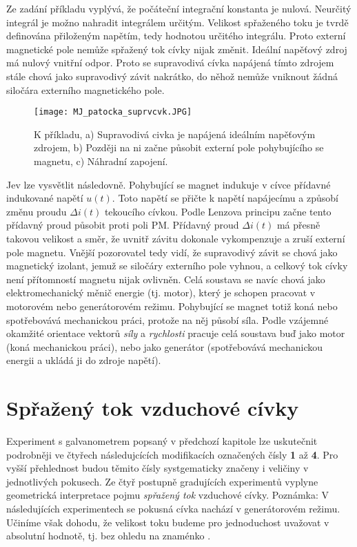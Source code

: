     Ze zadání příkladu vyplývá, že počáteční integrační konstanta je nulová. Neurčitý integrál je
    možno nahradit integrálem určitým. Velikost spřaženého toku je tvrdě definována přiloženým
    napětím, tedy hodnotou určitého integrálu. Proto externí magnetické pole nemůže spřažený tok
    cívky nijak změnit. Ideální napěťový zdroj má nulový vnitřní odpor. Proto se supravodivá cívka
    napájená tímto zdrojem stále chová jako supravodivý závit nakrátko, do něhož nemůže vniknout
    žádná siločára externího magnetického pole.
    
    \begin{figure}[ht!]
      \centering
      \texttt{[image: MJ\_patocka\_suprvcvk.JPG]}
      \caption[Supravodivá cívka]{K příkladu, a) Supravodivá civka je napájená ideálním napěťovým
               zdrojem, b) Později na ni začne působit externí pole pohybujícího se magnetu, c)
               Náhradní zapojení.}
      \label{es:fig_MJ_patocka_suprvcvk}
    \end{figure} 
    
    Jev lze vysvětlit následovně. Pohybující se magnet indukuje v cívce přídavné indukované napětí 
    \(u(t)\). Toto napětí se přičte k napětí napájecímu a způsobí změnu proudu \(\Delta i(t)\)
    tekoucího cívkou. Podle Lenzova principu začne tento přídavný proud působit proti poli PM.
    Přídavný proud \(\Delta i(t)\) má přesně takovou velikost a směr, že uvnitř závitu dokonale
    vykompenzuje a zruší externí pole magnetu. Vnější pozorovatel tedy vidí, že supravodivý závit
    se chová jako magnetický izolant, jemuž se siločáry externího pole vyhnou, a celkový tok cívky
    není přítomností magnetu nijak ovlivněn. Celá soustava se navíc chová jako elektromechanický
    měnič energie (tj. motor), který je schopen pracovat v motorovém nebo generátorovém režimu.
    Pohybující se magnet totiž koná nebo spotřebovává mechanickou práci, protože na něj působí
    síla. Podle vzájemné okamžité orientace vektorů \emph{síly} a \emph{rychlosti} pracuje celá
    soustava buď jako motor (koná mechanickou práci), nebo jako generátor (spotřebovává mechanickou
    energii a ukládá ji do zdroje napětí).
        

    \section{Spřažený tok vzduchové cívky}\label{es:tokcvk_vzd}
      Experiment s galvanometrem popsaný v předchozí kapitole lze uskutečnit podrobněji ve čtyřech
      následujcících modifikacích označených čísly \textbf{1} až \textbf{4}. Pro vyšší přehlednost
      budou těmito čísly systgematicky značeny i veličiny v jednotlivých pokusech. Ze čtyř postupně
      gradujících experimentů vyplyne geometrická interpretace pojmu \emph{spřažený tok} vzduchové
      cívky. Poznámka: V následujících experimentech se pokusná  cívka nachází v generátorovém
      režimu. Učiníme však dohodu, že velikost toku budeme pro jednoduchost uvažovat v absolutní
      hodnotě, tj. bez ohledu na znaménko \cite[s.~12]{Patocka4}.

